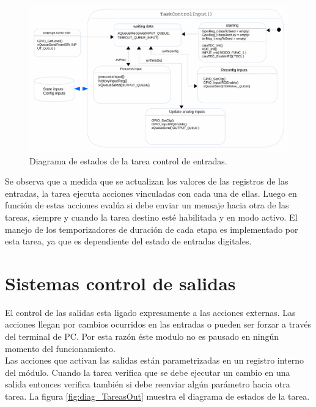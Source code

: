 \begin{figure}[h!]
	\centering
	\includegraphics[width=1.2\textwidth]{Figures/Cap_3/diagrama_tarea_input}
	\caption{ Diagrama de estados de la tarea control de entradas. }
	\label{fig:diag_TareasInp}
\end{figure}

Se observa que a medida que se actualizan los valores de las registros de las entradas, la tarea ejecuta acciones vinculadas con cada una de ellas. Luego en función de estas acciones evalúa si debe enviar un mensaje hacia otra de las tareas, siempre y cuando la tarea destino esté habilitada y en modo activo.
El manejo de los temporizadores de duración de cada etapa es implementado por esta tarea, ya que es dependiente del estado de entradas digitales.   

\section{ Sistemas control de salidas }
El control de las salidas esta ligado expresamente a las acciones externas. Las acciones llegan por cambios ocurridos en las entradas o pueden ser forzar a través del terminal de PC. Por esta razón éste modulo no es pausado en ningún momento del funcionamiento.\\
Las acciones que activan las salidas están parametrizadas en un registro interno del módulo. Cuando la tarea verifica que se debe ejecutar un cambio en una salida entonces verifica también si debe reenviar algún parámetro hacia otra tarea.
La figura \ref{fig:diag_TareasOut} muestra el diagrama de estados de la tarea.
 
